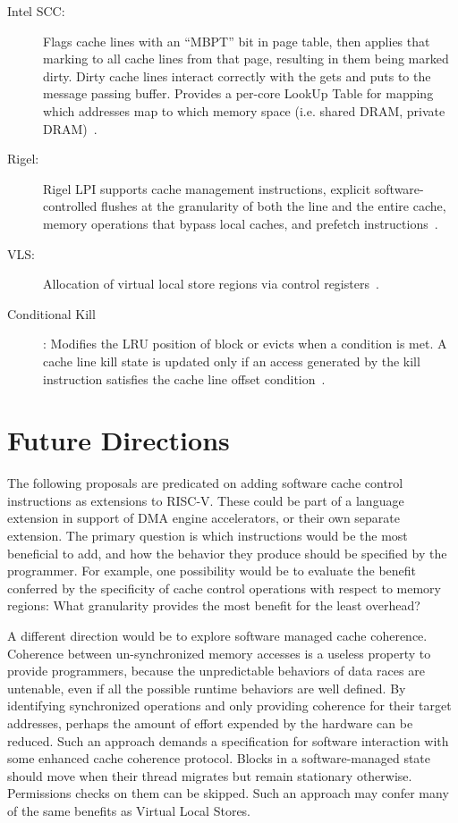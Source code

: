 \begin{description}
\item [Intel SCC:] 
Flags cache lines with an ``MBPT'' bit in page table, then applies that marking to all cache lines from that page, resulting in them being marked dirty. Dirty cache lines interact correctly with the gets and puts to the message passing buffer.
Provides a per-core LookUp Table for mapping which addresses map to which memory space (i.e. shared DRAM, private DRAM)~\cite{clauss2011evaluation}.
\item [Rigel:] Rigel LPI supports cache management instructions, explicit software-controlled flushes at the granularity of both the line and the entire cache, memory operations that bypass local caches, and prefetch instructions~\cite{kelm-isca09}.
\item [VLS:] Allocation of virtual local store regions via control registers~\cite{Cook:EECS-2009-131}.
\item[Conditional Kill]: Modifies the LRU position of block or evicts when a condition is met. A cache line kill state is updated only if an access generated by the kill instruction satisfies the cache line offset condition~\cite{jain-iccad01}.
\end{description}

\section{Future Directions}

The following proposals are predicated on adding software cache control instructions as extensions to RISC-V.
These could be part of a language extension in support of DMA engine accelerators, or their own separate extension.
The primary question is which instructions would be the most beneficial to add, and how the behavior they produce should be specified
by the programmer.
For example, one possibility would be to evaluate the benefit conferred by the specificity of cache control operations
with respect to memory regions:
What granularity provides the most benefit for the least overhead?

A different direction would be to explore software managed cache coherence.
Coherence between un-synchronized memory accesses is a useless property to provide programmers, because the unpredictable behaviors
of data races are untenable, even if all the possible runtime behaviors are well defined.
By identifying synchronized operations and only providing coherence for their target addresses, perhaps the amount of effort
expended by the hardware can be reduced.
Such an approach demands a specification for software interaction with some enhanced cache coherence protocol.
Blocks in a software-managed state should move when their thread migrates but remain stationary otherwise.
Permissions checks on them can be skipped.
Such an approach may confer many of the same benefits as Virtual Local Stores.

